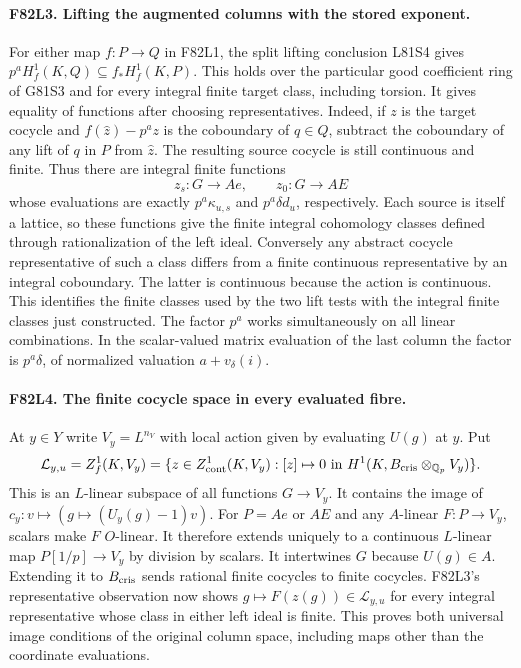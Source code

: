 \paragraph{F82L3. Lifting the augmented columns with the stored exponent.}
For either map $f:P\to Q$ in F82L1, the split lifting conclusion
L81S4 gives $p^aH^1_f(K,Q)\subseteq f_*H^1_f(K,P)$.
This holds over the particular good coefficient ring of G81S3
and for every integral finite target class, including torsion.
It gives equality of functions after choosing representatives.
Indeed, if $z$ is the target cocycle and
$f(\widehat z)-p^az$ is the coboundary of $q\in Q$, subtract
the coboundary of any lift of $q$ in $P$ from $\widehat z$.
The resulting source cocycle is still continuous and finite.
Thus there are integral finite functions
\[
 z_s:G\to Ae,\qquad z_0:G\to AE
\]
whose evaluations are exactly $p^a\kappa_{u,s}$ and
$p^a\delta d_u$, respectively. Each source is itself a lattice,
so these functions give the finite integral cohomology classes
defined through rationalization of the left ideal. Conversely any
abstract cocycle representative of such a class differs from a
finite continuous representative by an integral coboundary.
The latter is continuous because the action is continuous.
This identifies the finite classes used by the two lift tests
with the integral finite classes just constructed.
The factor $p^a$ works simultaneously on all linear combinations.
In the scalar-valued matrix evaluation of the last column the
factor is $p^a\delta$, of normalized valuation $a+v_\delta(i)$.

\paragraph{F82L4. The finite cocycle space in every evaluated fibre.}
At $y\in Y$ write $V_y=L^{n_V}$ with local action given by
evaluating $U(g)$ at $y$. Put
\[
  \mathcal L_{y,u}=Z_f^1(K,V_y)
     =\{z\in Z^1_{\rm cont}(K,V_y):
                 [z]\mapsto0\text{ in }H^1(K,B_{\rm cris}\otimes_{\mathbb Q_p}V_y)\}.
\]
This is an $L$-linear subspace of all functions $G\to V_y$.
It contains the image of $c_y:v\mapsto(g\mapsto(U_y(g)-1)v)$.
For $P=Ae$ or $AE$ and any $A$-linear $F:P\to V_y$, scalars
make $F$ $O$-linear. It therefore extends uniquely to a continuous
$L$-linear map $P[1/p]\to V_y$ by division by scalars. It
intertwines $G$ because $U(g)\in A$. Extending it to
$B_{\rm cris}$ sends rational finite cocycles to finite cocycles.
F82L3's representative observation now shows
$g\mapsto F(z(g))\in\mathcal L_{y,u}$ for every integral
representative whose class in either left ideal is finite.
This proves both universal image conditions of the original
column space, including maps other than the coordinate evaluations.

